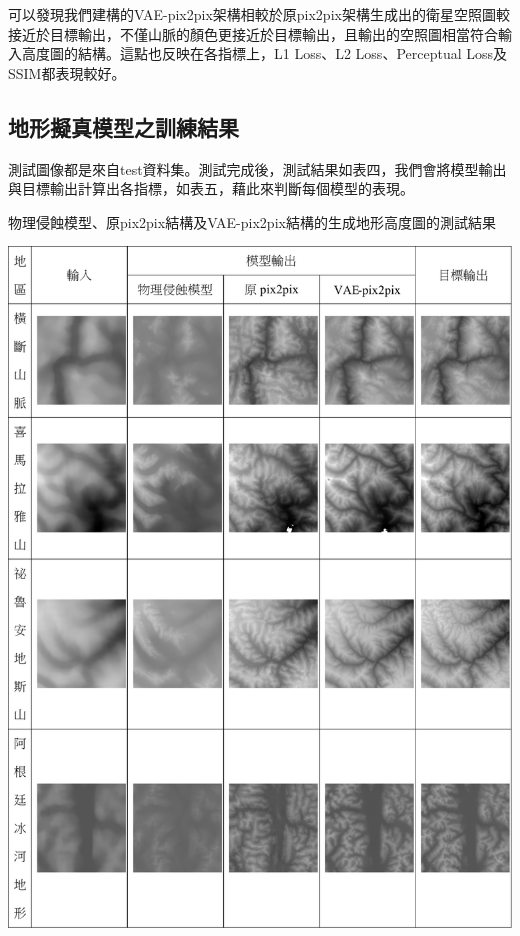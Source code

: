 \documentclass[a4paper, 12pt]{article}
\begin{document}
可以發現我們建構的VAE-pix2pix架構相較於原pix2pix架構生成出的衛星空照圖較接近於目標輸出，不僅山脈的顏色更接近於目標輸出，且輸出的空照圖相當符合輸入高度圖的結構。這點也反映在各指標上，L1 Loss、L2 Loss、Perceptual Loss及SSIM都表現較好。

\subsection{地形擬真模型之訓練結果}

測試圖像都是來自test資料集。測試完成後，測試結果如表四，我們會將模型輸出與目標輸出計算出各指標，如表五，藉此來判斷每個模型的表現。

\begin{table}[htbp]
    \centering
    \caption{物理侵蝕模型、原pix2pix結構及VAE-pix2pix結構的生成地形高度圖的測試結果}
    \label{tab:4}
    \includegraphics[width=0.9\linewidth]{fig/tab4.jpg}
\end{table}
\end{document}
